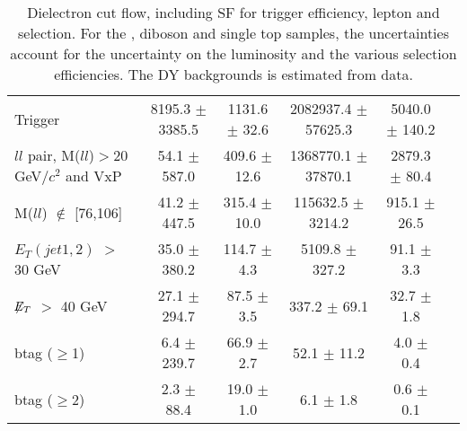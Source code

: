 \documentclass[amsmath,amssymb]{revtex4}
\begin{document}
\begin{landscape}
\begin{table}[p]
\begin{tabular}{|l|c|c|c|c|c|}
Trigger & 8195.3 $\pm$ 3385.5 & 1131.6 $\pm$ 32.6 & 2082937.4 $\pm$ 57625.3 & 5040.0 $\pm$ 140.2 \\
$ll$ pair, M($ll$)$>$20 GeV$/c^2$ and VxP & 54.1 $\pm$ 587.0 & 409.6 $\pm$ 12.6 & 1368770.1 $\pm$ 37870.1 & 2879.3 $\pm$ 80.4 \\
M($ll$) $\notin$ [76,106] & 41.2 $\pm$ 447.5 & 315.4 $\pm$ 10.0 & 115632.5 $\pm$ 3214.2 & 915.1 $\pm$ 26.5 \\
$E_T(jet1,2)$ $>$ 30 GeV & 35.0 $\pm$ 380.2 & 114.7 $\pm$ 4.3 & 5109.8 $\pm$ 327.2 & 91.1 $\pm$ 3.3 \\
$\not\!\!E_T$ $>$ 40 GeV & 27.1 $\pm$ 294.7 & 87.5 $\pm$ 3.5 & 337.2 $\pm$ 69.1 & 32.7 $\pm$ 1.8 \\
btag ($\ge$1) & 6.4 $\pm$ 239.7 & 66.9 $\pm$ 2.7 & 52.1 $\pm$ 11.2 & 4.0 $\pm$ 0.4 \\
btag ($\ge$2) & 2.3 $\pm$ 88.4 & 19.0 $\pm$ 1.0 & 6.1 $\pm$ 1.8 & 0.6 $\pm$ 0.1 \\
\hline 
\hline
\end{tabular}
\caption{ Dielectron cut flow, including SF for trigger efficiency, lepton and \met selection. For the \ttbar, diboson and single top samples, the uncertainties account for the uncertainty on the luminosity and the various selection efficiencies. The DY backgrounds is estimated from data.}
\label{Table:CutFlow_ee}
\end{table}
\end{landscape}
\clearpage
\end{document}
